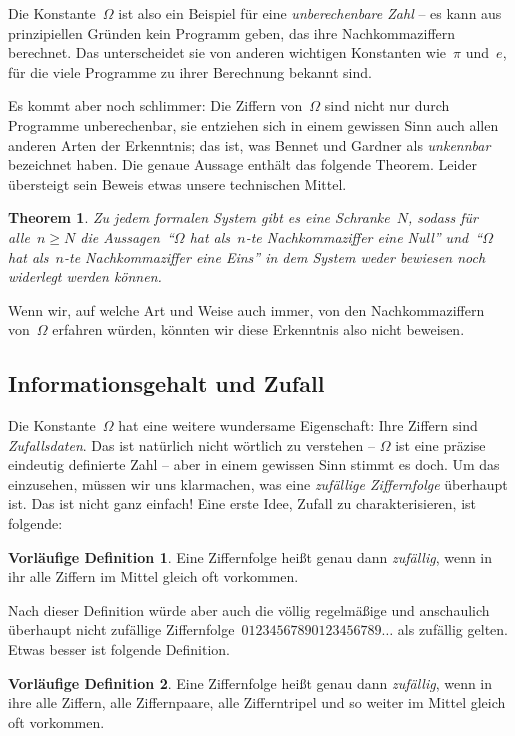 \documentclass[twoside]{../zirkelblatt1415}
\theoremstyle{definition}
\newtheorem{defn'}{Vorläufige Definition}[section]
\theoremstyle{plain}
\newtheorem{thm}[defn]{Theorem}
\theoremstyle{remark}
\begin{document}
Die Konstante~$\Omega$ ist also ein Beispiel für eine \emph{unberechenbare
Zahl} -- es kann aus prinzipiellen Gründen kein Programm geben, das ihre
Nachkommaziffern berechnet. Das unterscheidet sie von anderen wichtigen
Konstanten wie~$\pi$ und~$e$, für die viele Programme zu ihrer Berechnung
bekannt sind.

Es kommt aber noch schlimmer: Die Ziffern von~$\Omega$ sind nicht nur durch
Programme unberechenbar, sie entziehen sich in einem gewissen Sinn auch allen
anderen Arten der Erkenntnis; das ist, was Bennet und Gardner als
\emph{unkennbar} bezeichnet haben. Die genaue Aussage enthält das folgende
Theorem. Leider übersteigt sein Beweis etwas unsere technischen Mittel.

\begin{thm}Zu jedem formalen System gibt es eine Schranke~$N$, sodass für
alle~$n \geq N$ die Aussagen~"`$\Omega$ hat als~$n$-te Nachkommaziffer eine
Null"' und~"`$\Omega$ hat als~$n$-te Nachkommaziffer eine Eins"' in dem System
weder bewiesen noch widerlegt werden können.
\end{thm}

Wenn wir, auf welche Art und Weise auch immer, von den Nachkommaziffern
von~$\Omega$ erfahren würden, könnten wir diese Erkenntnis also nicht beweisen.


\subsection{Informationsgehalt und Zufall}

Die Konstante~$\Omega$ hat eine weitere wundersame Eigenschaft: Ihre
Ziffern sind \emph{Zufallsdaten}. Das ist natürlich nicht wörtlich zu verstehen
-- $\Omega$ ist eine präzise eindeutig definierte Zahl -- aber in einem
gewissen Sinn stimmt es doch. Um das einzusehen, müssen wir uns klarmachen, was
eine \emph{zufällige Ziffernfolge} überhaupt ist. Das ist nicht ganz einfach!
Eine erste Idee, Zufall zu charakterisieren, ist folgende:

\begin{defn'}Eine Ziffernfolge heißt genau dann \emph{zufällig}, wenn in ihr alle
Ziffern im Mittel gleich oft vorkommen.\end{defn'}

Nach dieser Definition würde aber auch die völlig regelmäßige und anschaulich
überhaupt nicht zufällige Ziffernfolge~$01234567890123456789\ldots$ als
zufällig gelten. Etwas besser ist folgende Definition.

\begin{defn'}Eine Ziffernfolge heißt genau dann \emph{zufällig}, wenn in ihre alle
Ziffern, alle Ziffernpaare, alle Zifferntripel und so weiter im Mittel gleich
oft vorkommen.\end{defn'}
\end{document}
